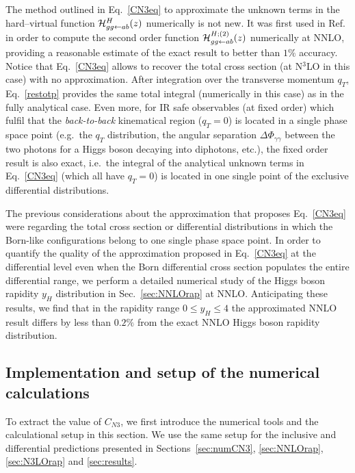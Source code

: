 \documentclass[12pt]{article}
\def\ito{\leftarrow}
\DeclareRobustCommand{\qt}{q_T}
\begin{document}
The method outlined in Eq.~\eqref{CN3eq} to approximate the unknown terms in the hard--virtual function ${\cal H}^H_{gg\ito ab}(z)$ numerically is not new. It was first used in Ref.~\cite{Bozzi:2005wk} in order to compute the second order function ${\cal H}^{H;(2)}_{gg\ito ab}(z)$ numerically at NNLO, providing a reasonable estimate of the exact result to better than $1\%$ accuracy. Notice that Eq.~\eqref{CN3eq} allows to recover the total cross section (at N$^{3}$LO in this case) with no approximation. After integration over the transverse momentum $\qt$, Eq.~\eqref{restotp} provides the same total integral (numerically in this case)  as in the fully analytical case. Even more, for IR safe observables (at fixed order) which fulfil that the \textit{back-to-back} kinematical region ($\qt=0$) is located in a single phase space point (e.g.\ the $\qt$ distribution, the angular separation $\Delta \Phi _{\gamma\gamma}$ between the two photons for a Higgs boson decaying into diphotons, etc.), the fixed order result is also exact, i.e.\ the integral of the analytical unknown terms in Eq.~\eqref{CN3eq} (which all have $\qt=0$) is located in one single point of the exclusive differential distributions. 

The previous considerations about the approximation that proposes Eq.~\eqref{CN3eq} were regarding the total cross section or differential distributions in which the Born-like configurations belong to one single phase space point.
In order to quantify the quality of the approximation proposed in Eq.~\eqref{CN3eq} at the differential level even when the Born differential cross section populates the entire differential range, we perform a detailed numerical study of the Higgs boson rapidity $y_{H}$ distribution in Sec.~\ref{sec:NNLOrap} at NNLO. Anticipating these results,  we find that in the rapidity range $0\leq y_{H}\leq 4$ the approximated NNLO result differs by less than $0.2\%$ from the exact NNLO Higgs boson rapidity distribution.

\subsection{Implementation and setup of the numerical calculations}
\label{sec:numsetup}
To extract the value of $C_{N3}$, we first introduce the numerical tools and the calculational setup in this section. We use the same setup for the inclusive and differential predictions presented in Sections~\ref{sec:numCN3}, \ref{sec:NNLOrap}, \ref{sec:N3LOrap} and \ref{sec:results}.
\end{document}
